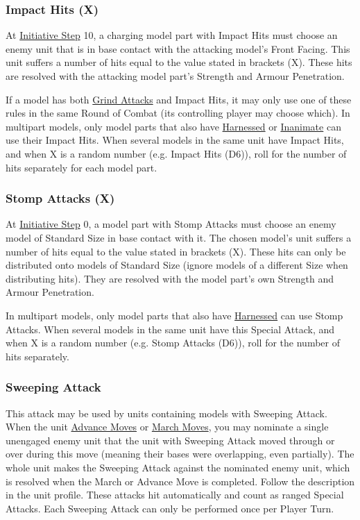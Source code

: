 \subsubsection{Impact Hits (X)}
\label{impact_hits}

At \hyperref[initiative_order]{Initiative Step} 10, a charging model part with Impact Hits must choose an enemy unit that is in base contact with the attacking model's Front Facing. This unit suffers a number of hits equal to the value stated in brackets (X). These hits are resolved with the attacking model part's Strength and Armour Penetration.

If a model has both \hyperref[grind_attacks]{Grind Attacks} and Impact Hits, it may only use one of these rules in the same Round of Combat (its controlling player may choose which). In multipart models, only model parts that also have \hyperref[harnessed]{Harnessed} or \hyperref[inanimate]{Inanimate} can use their Impact Hits. When several models in the same unit have Impact Hits, and when X is a random number (e.g. Impact Hits (D6)), roll for the number of hits separately for each model part.

\subsubsection{Stomp Attacks (X)}
\label{stomp_attacks}

At \hyperref[initiative_order]{Initiative Step} 0, a model part with Stomp Attacks must choose an enemy model of Standard Size in base contact with it. The chosen model's unit suffers a number of hits equal to the value stated in brackets (X). These hits can only be distributed onto models of Standard Size (ignore models of a different Size when distributing hits). They are resolved with the model part's own Strength and Armour Penetration.

In multipart models, only model parts that also have \hyperref[harnessed]{Harnessed} can use Stomp Attacks. When several models in the same unit have this Special Attack, and when X is a random number (e.g. Stomp Attacks (D6)), roll for the number of hits separately.

\subsubsection{Sweeping Attack}
\label{sweeping_attack}

This attack may be used by units containing models with Sweeping Attack. When the unit \hyperref[advance_move]{Advance Moves} or \hyperref[march_move]{March Moves}, you may nominate a single unengaged enemy unit that the unit with Sweeping Attack moved through or over during this move (meaning their bases were overlapping, even partially). The whole unit makes the Sweeping Attack against the nominated enemy unit, which is resolved when the March or Advance Move is completed. Follow the description in the unit profile. These attacks hit automatically and count as ranged Special Attacks. Each Sweeping Attack can only be performed once per Player Turn.

